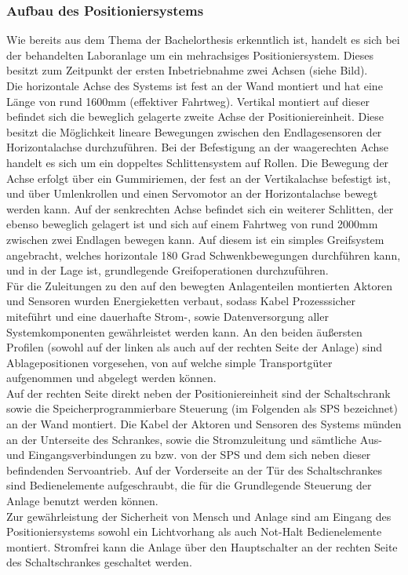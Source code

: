 \documentclass[../Bachelorarbeit.tex]{subfiles}
\begin{document}
\subsubsection{Aufbau des Positioniersystems} \label{aufbau}
Wie bereits aus dem Thema der Bachelorthesis erkenntlich ist, handelt es sich bei der behandelten Laboranlage um ein mehrachsiges Positioniersystem. Dieses besitzt zum Zeitpunkt der ersten Inbetriebnahme zwei Achsen (siehe Bild).\\
Die horizontale Achse des Systems ist fest an der Wand montiert und hat eine Länge von rund 1600mm (effektiver Fahrtweg). Vertikal montiert auf dieser befindet sich die beweglich gelagerte zweite Achse der Positioniereinheit. Diese besitzt die Möglichkeit lineare Bewegungen zwischen den Endlagesensoren der Horizontalachse durchzuführen. Bei der Befestigung an der waagerechten Achse handelt es sich um ein doppeltes Schlittensystem auf Rollen. Die Bewegung der Achse erfolgt über ein Gummiriemen, der fest an der Vertikalachse befestigt ist, und über Umlenkrollen und einen Servomotor an der Horizontalachse bewegt werden kann. Auf der senkrechten Achse befindet sich ein weiterer Schlitten, der ebenso beweglich gelagert ist und sich auf einem Fahrtweg von rund 2000mm zwischen zwei Endlagen bewegen kann. Auf diesem ist ein simples Greifsystem angebracht, welches horizontale 180 Grad Schwenkbewegungen durchführen kann, und in der Lage ist, grundlegende Greifoperationen durchzuführen.\\
Für die Zuleitungen zu den auf den bewegten Anlagenteilen montierten Aktoren und Sensoren wurden Energieketten verbaut, sodass Kabel Prozesssicher miteführt und eine dauerhafte Strom-, sowie Datenversorgung aller Systemkomponenten gewährleistet werden kann. An den beiden äußersten Profilen (sowohl auf der linken als auch auf der rechten Seite der Anlage) sind Ablagepositionen vorgesehen, von \bzw auf welche simple Transportgüter aufgenommen und abgelegt werden können.\\
Auf der rechten Seite direkt neben der Positioniereinheit sind der Schaltschrank sowie die Speicherprogrammierbare Steuerung (im Folgenden als SPS bezeichnet) an der Wand montiert. Die Kabel der Aktoren und Sensoren des Systems münden an der Unterseite des Schrankes, sowie die Stromzuleitung und sämtliche Aus- und Eingangsverbindungen zu bzw. von der SPS und dem sich neben dieser befindenden Servoantrieb. Auf der Vorderseite an der Tür des Schaltschrankes sind Bedienelemente aufgeschraubt, die für die Grundlegende Steuerung der Anlage benutzt werden können.\\
Zur gewährleistung der Sicherheit von Mensch und Anlage sind am Eingang des Positioniersystems sowohl ein Lichtvorhang als auch Not-Halt Bedienelemente montiert. Stromfrei kann die Anlage über den Hauptschalter an der rechten Seite des Schaltschrankes geschaltet werden.
\end{document}
